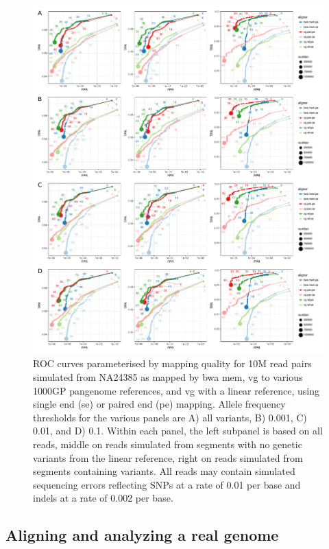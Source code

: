 \begin{figure}[htbp!] 
\centering    
\includegraphics[width=1.0\textwidth]{Chapter3/Figs/human-10M-results-7358a67_merge_panel_labeled.pdf}
\caption[Simulated reads from HG002 versus various human pangenome graphs.]{
  ROC curves parameterised by mapping quality for 10M read pairs simulated from NA24385 as mapped by bwa mem, vg to various 1000GP pangenome references, and vg with a linear reference, using single end (se) or paired end (pe) mapping.
  Allele frequency thresholds for the various panels are A) all variants, B) 0.001, C) 0.01, and D) 0.1.
  Within each panel, the left subpanel is based on all reads, middle on reads simulated from segments with no genetic variants from the linear reference, right on reads simulated from segments containing variants.
  All reads may contain simulated sequencing errors reflecting SNPs at a rate of 0.01 per base and indels at a rate of 0.002 per base.}
\label{fig:HG002_1000GP_sim}
\end{figure}

\subsection{Aligning and analyzing a real genome}

